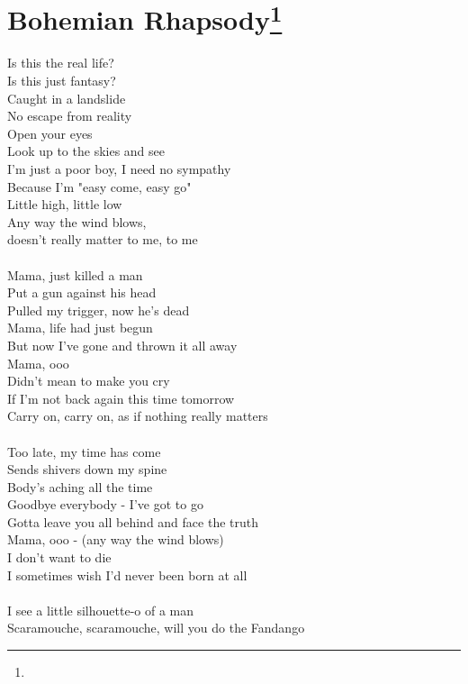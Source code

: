\chapter[Bohemian Rhapsody]{Bohemian Rhapsody\footnote{}}

Is this the real life? \\
Is this just fantasy? \\
Caught in a landslide \\
No escape from reality \\
Open your eyes \\
Look up to the skies and see \\
I'm just a poor boy, I need no sympathy \\
Because I'm "easy come, easy go" \\
Little high, little low \\
Any way the wind blows, \\
doesn't really matter to me, 
to me \\
\\
Mama, just killed a man \\
Put a gun against his head \\
Pulled my trigger, now he's dead \\
Mama, life had just begun \\
But now I've gone and thrown it all away \\
Mama, ooo \\
Didn't mean to make you cry \\
If I'm not back again this time tomorrow \\
Carry on, carry on, as if nothing really matters \\
\\
Too late, my time has come \\
Sends shivers down my spine \\
Body's aching all the time \\
Goodbye everybody - I've got to go \\
Gotta leave you all behind and face the truth \\
Mama, ooo - (any way the wind blows) \\
I don't want to die \\
I sometimes wish I'd never been born at all \\
\\
I see a little silhouette-o of a man \\
Scaramouche, scaramouche, will you do the Fandango \\
